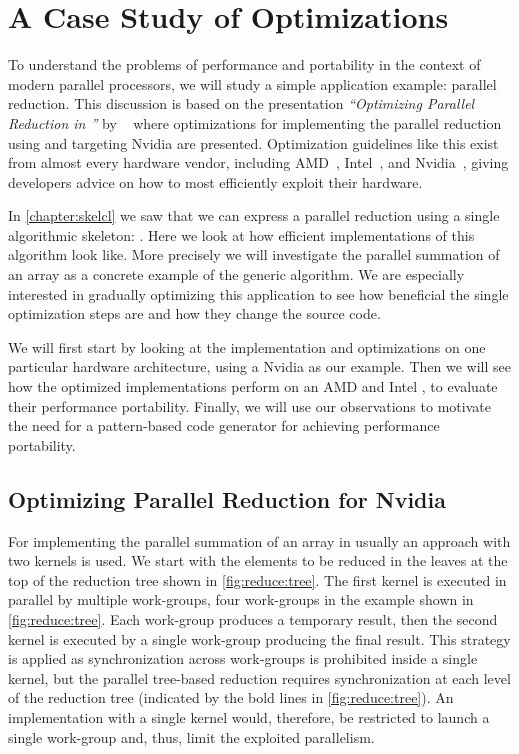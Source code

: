 \section{A Case Study of \OpenCL Optimizations}
\label{sec:reduce:case-study}
\label{section:reduce:case-study}
To understand the problems of performance and portability in the context of modern parallel processors, we will study a simple application example: parallel reduction.
This discussion is based on the presentation \emph{``Optimizing Parallel Reduction in \CUDA''} by \citeauthor{Harris2007}~\cite{Harris2007} where optimizations for implementing the parallel reduction using \CUDA and targeting Nvidia \GPUs are presented.
Optimization guidelines like this exist from almost every hardware vendor, including AMD~\cite{AMDProgrammingGuide}, Intel~\cite{IntelGPUProgrammingGuide, IntelXeonProgrammingGuide}, and Nvidia~\cite{CUDAProgrammingGuide}, giving developers advice on how to most efficiently exploit their hardware.

In \autoref{chapter:skelcl} we saw that we can express a parallel reduction using a single algorithmic skeleton: \reduce.
Here we look at how efficient \OpenCL implementations of this algorithm look like.
More precisely we will investigate the parallel summation of an array as a concrete example of the generic \reduce algorithm.
We are especially interested in gradually optimizing this application to see how beneficial the single optimization steps are and how they change the source code.

We will first start by looking at the implementation and optimizations on one particular hardware architecture, using a Nvidia \GPU as our example.
Then we will see how the optimized implementations perform on an AMD \GPU and Intel \CPU, to evaluate their performance portability.
Finally, we will use our observations to motivate the need for a pattern-based code generator for achieving performance portability.

\subsection{Optimizing Parallel Reduction for Nvidia \GPUs}
For implementing the parallel summation of an array in \OpenCL usually an approach with two \OpenCL kernels is used.
We start with the elements to be reduced in the leaves at the top of the reduction tree shown in \autoref{fig:reduce:tree}.
The first \OpenCL kernel is executed in parallel by multiple \OpenCL work-groups, four work-groups in the example shown in \autoref{fig:reduce:tree}.
Each work-group produces a temporary result, then the second \OpenCL kernel is executed by a single \OpenCL work-group producing the final result.
This strategy is applied as synchronization across work-groups is prohibited inside a single \OpenCL kernel, but the parallel tree-based reduction requires synchronization at each level of the reduction tree (indicated by the bold lines in \autoref{fig:reduce:tree}).
An implementation with a single \OpenCL kernel would, therefore, be restricted to launch a single \OpenCL work-group and, thus, limit the exploited parallelism.

